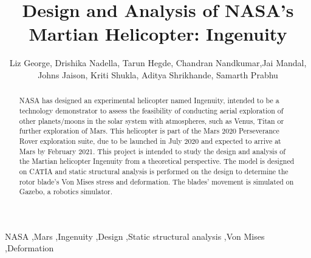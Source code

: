 \documentclass[preprint,12pt]{elsarticle}
\begin{document}
\begin{frontmatter}


\title{\textbf{Design and Analysis of NASA's Martian Helicopter: Ingenuity}}




\author{Liz George, Drishika Nadella, Tarun Hegde, Chandran Nandkumar,Jai Mandal, Johns Jaison, Kriti Shukla, Aditya Shrikhande, Samarth Prabhu}

\address{National Institute of Technology Karnataka, Surathkal}

\begin{abstract}
NASA has designed an experimental helicopter named Ingenuity, intended to be a technology demonstrator to assess the feasibility of conducting aerial exploration of other planets/moons in the solar system with atmospheres, such as Venus, Titan or further exploration of Mars. This helicopter is part of the Mars 2020 Perseverance Rover exploration suite, due to be launched in July 2020 and expected to arrive at Mars by February 2021. This project is intended to study the design and analysis of the Martian helicopter Ingenuity from a theoretical perspective. The model is designed on CATIA and static structural analysis is performed on the design to determine the rotor blade's Von Mises stress and deformation. The blades' movement is simulated on Gazebo, a robotics simulator.

\end{abstract}

\begin{keyword}
NASA \sep Mars \sep Ingenuity \sep Design \sep Static structural analysis \sep Von Mises \sep Deformation


\end{keyword}

\end{frontmatter}
\end{document}
